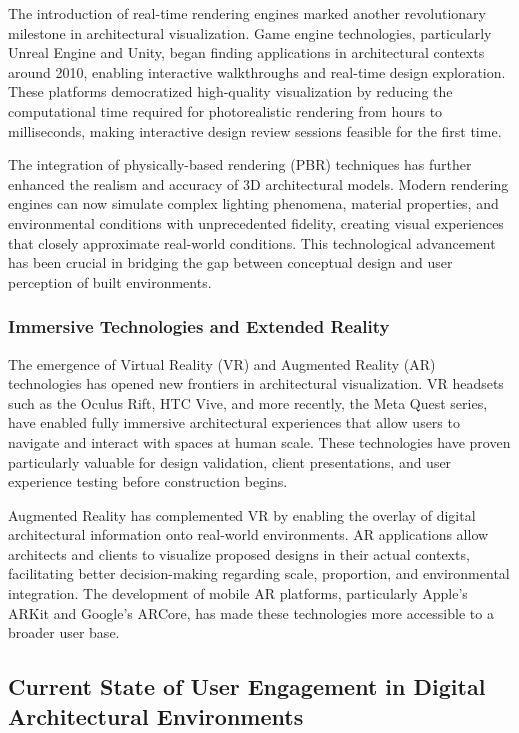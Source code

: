 The introduction of real-time rendering engines marked another revolutionary milestone in architectural visualization. Game engine technologies, particularly Unreal Engine and Unity, began finding applications in architectural contexts around 2010, enabling interactive walkthroughs and real-time design exploration. These platforms democratized high-quality visualization by reducing the computational time required for photorealistic rendering from hours to milliseconds, making interactive design review sessions feasible for the first time.

The integration of physically-based rendering (PBR) techniques has further enhanced the realism and accuracy of 3D architectural models. Modern rendering engines can now simulate complex lighting phenomena, material properties, and environmental conditions with unprecedented fidelity, creating visual experiences that closely approximate real-world conditions. This technological advancement has been crucial in bridging the gap between conceptual design and user perception of built environments.

\subsubsection{Immersive Technologies and Extended Reality}
\label{subsubsec:immersive_technologies}

The emergence of Virtual Reality (VR) and Augmented Reality (AR) technologies has opened new frontiers in architectural visualization. VR headsets such as the Oculus Rift, HTC Vive, and more recently, the Meta Quest series, have enabled fully immersive architectural experiences that allow users to navigate and interact with spaces at human scale. These technologies have proven particularly valuable for design validation, client presentations, and user experience testing before construction begins.

Augmented Reality has complemented VR by enabling the overlay of digital architectural information onto real-world environments. AR applications allow architects and clients to visualize proposed designs in their actual contexts, facilitating better decision-making regarding scale, proportion, and environmental integration. The development of mobile AR platforms, particularly Apple's ARKit and Google's ARCore, has made these technologies more accessible to a broader user base.

\subsection{Current State of User Engagement in Digital Architectural Environments}
\label{subsec:current_user_engagement}

